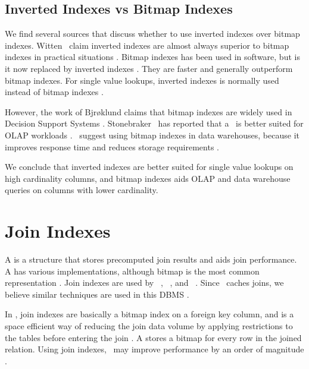 \subsection{Inverted Indexes vs Bitmap Indexes}
\label{sub:Inverted Indexes vs Bitmap Indexes}
We find several sources that discuss whether to use inverted indexes over bitmap indexes. Witten \ea~claim inverted indexes are almost always superior to bitmap indexes in practical situations \cite{Witten1999-qq}. Bitmap indexes has been used in  software, but is it now replaced by inverted indexes \cite{Bjorklund2011-wh}. They are faster and generally outperform bitmap indexes. For single value lookups, inverted indexes is normally used instead of bitmap indexes \cite{Moffat1992-tz}.

However, the work of Bjrøklund claims that bitmap indexes are widely used in Decision Support Systems \cite{Bjorklund2011-wh}. Stonebraker \ea~has reported that a \biti~is better suited for OLAP workloads \cite{Stonebraker2005-qz}. \oracle~suggest using bitmap indexes in data warehouses, because it improves response time and reduces storage requirements \cite{noauthor_undated-hp}.

We conclude that inverted indexes are better suited for single value lookups on high cardinality columns, and bitmap indexes aids OLAP and data warehouse queries on columns with lower cardinality.

\section{Join Indexes}
\label{sec:Join Indexes}
A  is a structure that stores precomputed join results and aids join performance. A  has various implementations, although bitmap is the most common representation \cite{Bjorklund2011-wh}. Join indexes are used by \monetdb~\cite{Boncz2002-yj}, \monetx~\cite{Boncz2005-wj}, and \oracle~\cite{noauthor_undated-hp}. Since \exasol~caches joins, we believe similar techniques are used in this DBMS \cite{Exasol2014-xh}.

In \oracle, join indexes are basically a bitmap index on a foreign key column, and is a space efficient way of reducing the join data volume by applying restrictions to the tables before entering the join \cite{noauthor_undated-xi}. A  stores a bitmap for every row in the joined relation. Using join indexes, \oracle~may improve performance by an order of magnitude \cite{noauthor_undated-hp}.

